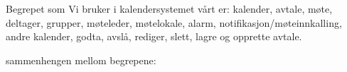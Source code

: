 Begrepet som Vi bruker i kalendersystemet vårt er:
kalender, avtale, møte, deltager, grupper, møteleder, møtelokale, alarm, notifikasjon/møteinnkalling, andre kalender, godta, avslå, rediger, slett, lagre og opprette avtale.

sammenhengen mellom begrepene:
